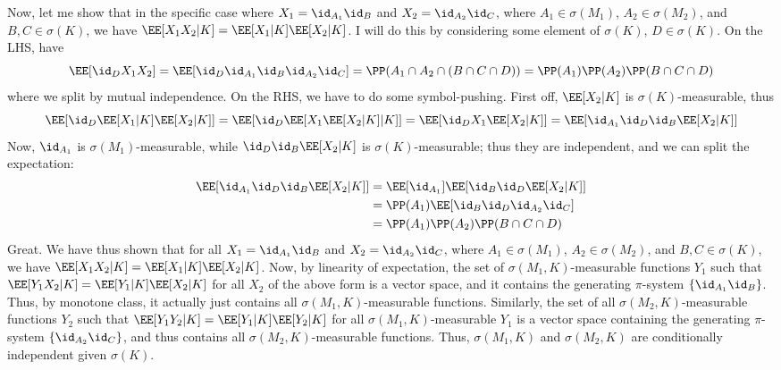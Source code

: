 \documentclass{scrartcl}
\begin{document}
Now, let me show that in the specific case where $X_1 = \id_{A_1}\id_B$ and $X_2 = \id_{A_2}\id_C$, where $A_1\in \sigma(M_1)$, $A_2\in \sigma(M_2)$, and $B,C\in \sigma(K)$, we have $\EE[X_1X_2|K] = \EE[X_1|K]\EE[X_2|K]$. I will do this by considering some element of $\sigma(K)$, $D\in \sigma(K)$. On the LHS, have
\[
    \EE[\id_D X_1X_2] = \EE[\id_D\id_{A_1}\id_B\id_{A_2}\id_C] = \PP(A_1\cap A_2\cap (B \cap C\cap D)) = \PP(A_1)\PP(A_2)\PP(B\cap C \cap D)
\]
where we split by mutual independence. On the RHS, we have to do some symbol-pushing. First off, $\EE[X_2 | K]$ is $\sigma(K)$-measurable, thus
\[
    \EE[\id_D\EE[X_1|K]\EE[X_2|K]] = \EE[\id_D\EE[X_1 \EE[X_2 | K] | K]] = \EE[\id_D X_1 \EE[X_2 | K]] = \EE[\id_{A_1}\id_D \id_B \EE[X_2 | K]]
\]
Now, $\id_{A_1}$ is $\sigma(M_1)$-measurable, while $\id_D \id_B \EE[X_2|K]$ is $\sigma(K)$-measurable; thus they are independent, and we can split the expectation:
\begin{align*}
    \EE[\id_{A_1}\id_D \id_B \EE[X_2 | K]] &= \EE[\id_{A_1}]\EE[\id_B\id_D \EE[X_2 | K]]\\
    &= \PP(A_1)\EE[\id_B\id_D\id_{A_2}\id_C]\\
    &= \PP(A_1)\PP(A_2)\PP(B\cap C\cap D)
\end{align*}
Great. We have thus shown that for all $X_1 = \id_{A_1}\id_B$ and $X_2 = \id_{A_2}\id_C$, where $A_1\in \sigma(M_1)$, $A_2\in \sigma(M_2)$, and $B,C\in \sigma(K)$, we have $\EE[X_1X_2|K] = \EE[X_1|K]\EE[X_2|K]$. Now, by linearity of expectation, the set of $\sigma(M_1, K)$-measurable functions $Y_1$ such that $\EE[Y_1 X_2 | K] = \EE[Y_1 | K]\EE[X_2|K]$ for all $X_2$ of the above form is a vector space, and it contains the generating $\pi$-system $\{\id_{A_1}\id_B\}$. Thus, by monotone class, it actually just contains all $\sigma(M_1,K)$-measurable functions. Similarly, the set of all $\sigma(M_2, K)$-measurable functions $Y_2$ such that
$\EE[Y_1 Y_2 |K] = \EE[Y_1|K]\EE[Y_2|K]$ for all $\sigma(M_1,K)$-measurable $Y_1$ is a vector space containing the generating $\pi$-system $\{\id_{A_2}\id_C\}$, and thus contains all $\sigma(M_2,K)$-measurable functions. Thus, $\sigma(M_1,K)$ and $\sigma(M_2,K)$ are conditionally independent given $\sigma(K)$.

\end{document}
